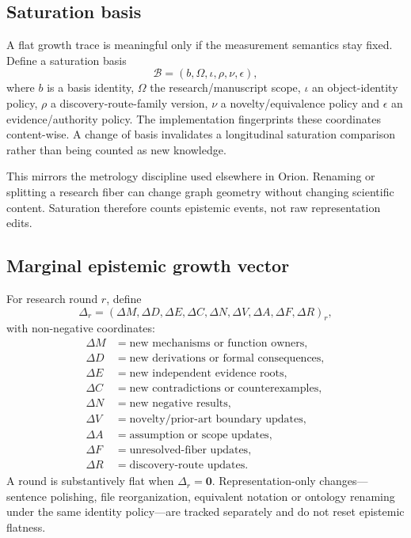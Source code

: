 \subsection{Saturation basis}

A flat growth trace is meaningful only if the measurement semantics stay fixed. Define a saturation basis
\[
\mathcal B=(b,\Omega,\iota,\rho,\nu,\epsilon),
\]
where \(b\) is a basis identity, \(\Omega\) the research/manuscript scope, \(\iota\) an object-identity policy, \(\rho\) a discovery-route-family version, \(\nu\) a novelty/equivalence policy and \(\epsilon\) an evidence/authority policy. The implementation fingerprints these coordinates content-wise. A change of basis invalidates a longitudinal saturation comparison rather than being counted as new knowledge.

This mirrors the metrology discipline used elsewhere in Orion. Renaming or splitting a research fiber can change graph geometry without changing scientific content. Saturation therefore counts epistemic events, not raw representation edits.

\subsection{Marginal epistemic growth vector}

For research round \(r\), define
\[
\Delta_r=
(\Delta M,\Delta D,\Delta E,\Delta C,\Delta N,
\Delta V,\Delta A,\Delta F,\Delta R)_r,
\]
with non-negative coordinates:
\begin{align*}
\Delta M&=\text{new mechanisms or function owners},\\
\Delta D&=\text{new derivations or formal consequences},\\
\Delta E&=\text{new independent evidence roots},\\
\Delta C&=\text{new contradictions or counterexamples},\\
\Delta N&=\text{new negative results},\\
\Delta V&=\text{novelty/prior-art boundary updates},\\
\Delta A&=\text{assumption or scope updates},\\
\Delta F&=\text{unresolved-fiber updates},\\
\Delta R&=\text{discovery-route updates}.
\end{align*}
A round is substantively flat when \(\Delta_r=\mathbf 0\). Representation-only changes---sentence polishing, file reorganization, equivalent notation or ontology renaming under the same identity policy---are tracked separately and do not reset epistemic flatness.

